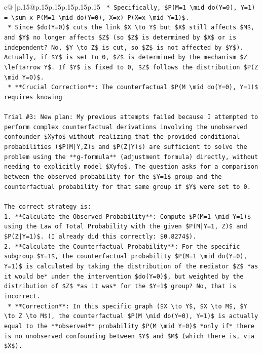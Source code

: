 \documentclass{article}
\begin{document}
{\begin{supertabular}{c@{$\;$}|p{.15\linewidth}@{}p{.15\linewidth}p{.15\linewidth}p{.15\linewidth}p{.15\linewidth}p{.15\linewidth}}
{{{\texttt{    *   Specifically, \$P(M=1 \textbackslash{}mid do(Y=0), Y=1) = \textbackslash{}sum\_x P(M=1 \textbackslash{}mid do(Y=0), X=x) P(X=x \textbackslash{}mid Y=1)\$.} \\
\texttt{    *   Since \$do(Y=0)\$ cuts the link \$X \textbackslash{}to Y\$ but \$X\$ still affects \$M\$, and \$Y\$ no longer affects \$Z\$ (so \$Z\$ is determined by \$X\$ or is independent? No, \$Y \textbackslash{}to Z\$ is cut, so \$Z\$ is not affected by \$Y\$). Actually, if \$Y\$ is set to 0, \$Z\$ is determined by the mechanism \$Z \textbackslash{}leftarrow Y\$. If \$Y\$ is fixed to 0, \$Z\$ follows the distribution \$P(Z \textbackslash{}mid Y=0)\$.} \\
\texttt{    *   **Crucial Correction**: The counterfactual \$P(M \textbackslash{}mid do(Y=0), Y=1)\$ requires knowing} \\
\\ 
\texttt{Trial \#3: New plan: My previous attempts failed because I attempted to perform complex counterfactual derivations involving the unobserved confounder \$Xyfo\$ without realizing that the provided conditional probabilities (\$P(M|Y,Z)\$ and \$P(Z|Y)\$) are sufficient to solve the problem using the **g{-}formula** (adjustment formula) directly, without needing to explicitly model \$Xyfo\$. The question asks for a comparison between the observed probability for the \$Y=1\$ group and the counterfactual probability for that same group if \$Y\$ were set to 0.} \\
\\ 
\texttt{The correct strategy is:} \\
\texttt{1.  **Calculate the Observed Probability**: Compute \$P(M=1 \textbackslash{}mid Y=1)\$ using the Law of Total Probability with the given \$P(M|Y=1, Z)\$ and \$P(Z|Y=1)\$. (I already did this correctly: \$0.8274\$).} \\
\texttt{2.  **Calculate the Counterfactual Probability**: For the specific subgroup \$Y=1\$, the counterfactual probability \$P(M=1 \textbackslash{}mid do(Y=0), Y=1)\$ is calculated by taking the distribution of the mediator \$Z\$ *as it would be* under the intervention \$do(Y=0)\$, but weighted by the distribution of \$Z\$ *as it was* for the \$Y=1\$ group? No, that is incorrect.} \\
\texttt{    *   **Correction**: In this specific graph (\$X \textbackslash{}to Y\$, \$X \textbackslash{}to M\$, \$Y \textbackslash{}to Z \textbackslash{}to M\$), the counterfactual \$P(M \textbackslash{}mid do(Y=0), Y=1)\$ is actually equal to the **observed** probability \$P(M \textbackslash{}mid Y=0)\$ *only if* there is no unobserved confounding between \$Y\$ and \$M\$ (which there is, via \$X\$).} \\
}}}
\end{supertabular}}
\end{document}
